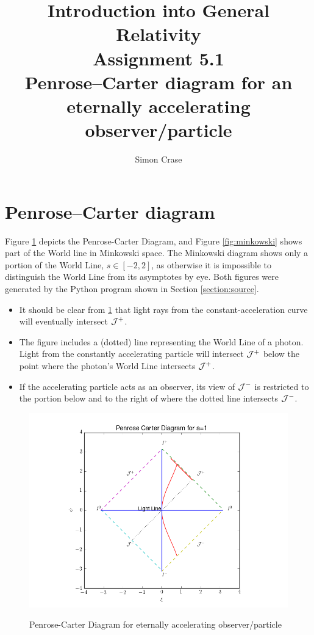 \documentclass[]{article}
\title{Introduction into General Relativity\\Assignment 5.1\\Penrose--Carter diagram for an eternally accelerating observer/particle}
\author{Simon Crase}
\begin{document}
\maketitle

\section{Penrose--Carter diagram}

Figure \ref{fig:penrose-carter} depicts the Penrose-Carter Diagram, and Figure \ref{fig:minkowski} shows part of the World line in Minkowski space. The Minkowski diagram shows only a portion of the World Line, $s\in [-2,2]$, as otherwise it is impossible to distinguish the World Line from its asymptotes by eye. Both figures were generated by the Python program shown in Section \ref{section:source}.
\begin{itemize}
	\item It should be clear from \ref{fig:penrose-carter} that light rays from the constant-acceleration curve will eventually intersect $\cal{J}^+$.
	\item The figure includes a (dotted) line representing the World Line of a photon. Light from the constantly accelerating particle will intersect  $\cal{J}^+$ below the point where the photon's World Line intersects  $\cal{J}^+$.
	\item If the accelerating particle acts as an observer, its view of  $\cal{J}^-$ is restricted to the portion below and to the right of where the dotted line intersects $\cal{J}^-$.
\end{itemize}
\begin{figure}[H]
	\caption{Penrose-Carter Diagram for eternally accelerating observer/particle}
	\centering
	\includegraphics[width=1.0\textwidth]{GR-Problem-5-1-2.png}
	\label{fig:penrose-carter}
\end{figure}
\end{document}
